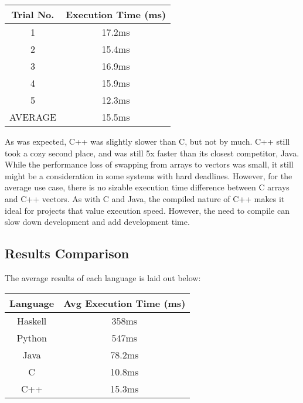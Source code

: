 \documentclass{article}
\begin{document}
                    \begin{center}
    \begin{tabular}{||c c|} 
    \hline
   Trial No. & Execution Time (ms)\\ [0.5ex] 
    \hline\hline
    1 & 17.2ms \\ 
     \hline
    2 & 15.4ms \\
     \hline
    3 & 16.9ms\\
    \hline
    4 & 15.9ms\\ 
     \hline
    5 & 12.3ms\\
    \hline\hline
    AVERAGE & 15.5ms\\
    \hline
    \end{tabular}
    \end{center}
    
    \medskip\noindent As was expected, C++ was slightly slower than C, but not by much. C++ still took a cozy second place, and was still 5x faster than its closest competitor, Java. While the performance loss of swapping from arrays to vectors was small, it still might be a consideration in some systems with hard deadlines. However, for the average use case, there is no sizable execution time difference between C arrays and C++ vectors. As with C and Java, the compiled nature of C++ makes it ideal for projects that value execution speed. However, the need to compile can slow down development and add development time.  
    
    \subsection{Results Comparison}
    
    \medskip\noindent The average results of each language is laid out below: 
                        \begin{center}
    \begin{tabular}{||c c|} 
    \hline
   Language & Avg Execution Time (ms)\\ [0.5ex] 
    \hline\hline
    Haskell & 358ms \\ 
     \hline
    Python & 547ms \\
     \hline
    Java & 78.2ms\\
    \hline
    C & 10.8ms\\ 
     \hline
    C++ & 15.3ms\\
    \hline
    \end{tabular}
    \end{center}
    
\end{document}
